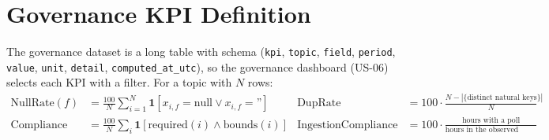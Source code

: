 \documentclass[11pt,a4paper]{article}
\begin{document}
\section{Governance KPI Definition}
The governance dataset is a long table with schema
(\texttt{kpi}, \texttt{topic}, \texttt{field}, \texttt{period}, \texttt{value}, \texttt{unit}, \texttt{detail}, \texttt{computed\_\allowbreak{}at\_\allowbreak{}utc}),
so the governance dashboard (US-06) selects each KPI with a filter. For a topic with $N$ rows:
\begin{align}
\text{NullRate}(f) &= \frac{100}{N}\sum_{i=1}^{N} \mathbf{1}[x_{i,f} = \text{null} \lor x_{i,f} = \text{''}] &
\text{DupRate} &= 100\cdot\frac{N - |\{\text{distinct natural keys}\}|}{N}\\
\text{Compliance} &= \frac{100}{N}\sum_{i} \mathbf{1}[\text{required}(i)\land \text{bounds}(i)] &
\text{IngestionCompliance} &= 100\cdot\frac{\text{hours with a poll}}{\text{hours in the observed window}}
\end{align}
\end{document}
